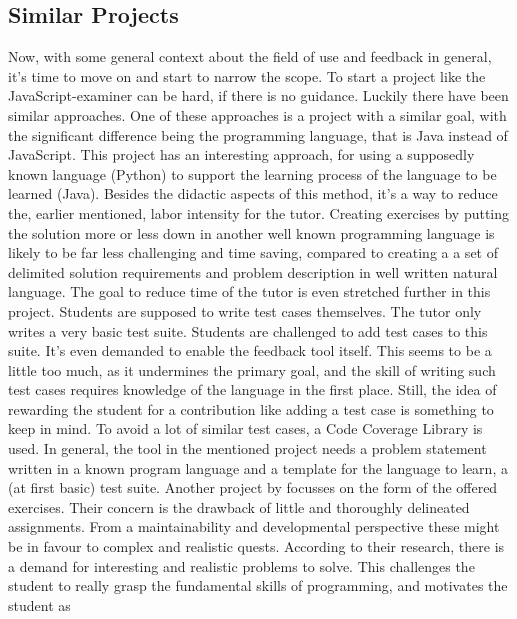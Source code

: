\documentclass{article}
\begin{document}
\subsection{Similar Projects}
Now, with some general context about the field of use and feedback in general,
it's time to move on and
start to narrow the scope. To start a project like the JavaScript-examiner can
be hard, if there is no guidance. Luckily there have been similar approaches. 
One of these approaches is a project with a similar goal, with the significant
difference being the programming language, that is Java instead of JavaScript. 
This project  \citep{o2014java} has an interesting approach, for using a 
supposedly known language (Python) to support the learning process of the 
language to be learned (Java). %
Besides the didactic aspects of this method, it's a way to reduce the,
earlier mentioned, labor intensity for the tutor. Creating exercises by 
putting the solution more or less down in another well known programming 
language is likely
to be far less challenging and time saving, compared to creating a
a set of delimited solution requirements and problem description
in well written natural language. The goal to reduce time of the tutor is even
stretched further in this project. Students are supposed to write test cases 
themselves. The tutor only writes a very basic test suite. Students are 
challenged to 
add test cases to this suite. It's even demanded to enable the feedback
tool itself. This seems to be a little too much, as it undermines the primary
goal, and the skill of writing such test cases requires knowledge of the
language in the first place. Still, the idea of rewarding the student for a
contribution like adding a test case is something to keep in mind. To avoid a 
lot of similar test cases, a Code Coverage Library is used. In general, 
the tool in the mentioned project needs a problem statement written in a known
program language and a template for the language to learn, a (at first basic) 
test suite. \newline
Another project by 
\citep{watson2011learning}
focusses on the form of the offered exercises. Their concern is the 
drawback of little and  thoroughly delineated assignments. From a
maintainability and developmental perspective these might be in favour 
to complex and realistic quests. According to their research, there is a demand
for interesting and realistic problems to solve. This challenges the student to
really grasp the fundamental skills of programming, and motivates the student as
\end{document}
